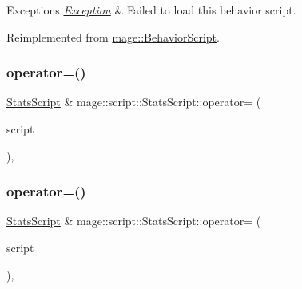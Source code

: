 \begin{DoxyExceptions}{Exceptions}
{\em \mbox{\hyperlink{classmage_1_1_exception}{Exception}}} & Failed to load this behavior script. \\
\hline
\end{DoxyExceptions}


Reimplemented from \mbox{\hyperlink{classmage_1_1_behavior_script_ae7864876b2ffb1d1d8d8a56e3099f1f2}{mage\+::\+Behavior\+Script}}.

\mbox{\label{classmage_1_1script_1_1_stats_script_a538428ec1763e0fb4b41839e7943ca56}} 
\subsubsection{\texorpdfstring{operator=()}{operator=()}\hspace{0.1cm}{\footnotesize\ttfamily [1/2]}}
{\footnotesize\ttfamily \mbox{\hyperlink{classmage_1_1script_1_1_stats_script}{Stats\+Script}} \& mage\+::script\+::\+Stats\+Script\+::operator= (\begin{DoxyParamCaption}\item[{const \mbox{\hyperlink{classmage_1_1script_1_1_stats_script}{Stats\+Script}} \&}]{script }\end{DoxyParamCaption})\hspace{0.3cm}{\ttfamily [default]}, {\ttfamily [noexcept]}}

\mbox{\label{classmage_1_1script_1_1_stats_script_ae99dbfbff061fcc916c968d670a1e481}} 
\subsubsection{\texorpdfstring{operator=()}{operator=()}\hspace{0.1cm}{\footnotesize\ttfamily [2/2]}}
{\footnotesize\ttfamily \mbox{\hyperlink{classmage_1_1script_1_1_stats_script}{Stats\+Script}} \& mage\+::script\+::\+Stats\+Script\+::operator= (\begin{DoxyParamCaption}\item[{\mbox{\hyperlink{classmage_1_1script_1_1_stats_script}{Stats\+Script}} \&\&}]{script }\end{DoxyParamCaption})\hspace{0.3cm}{\ttfamily [default]}, {\ttfamily [noexcept]}}

